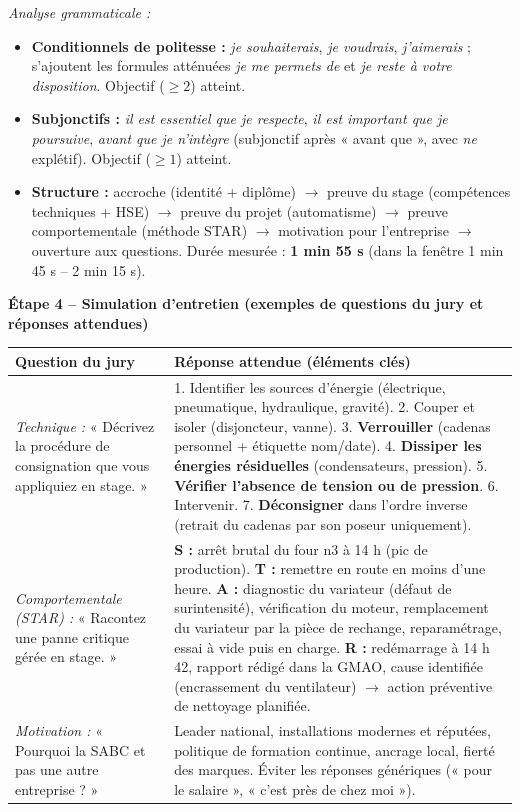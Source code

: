 \documentclass[11pt]{article}
\begin{document}
\emph{Analyse grammaticale :}
\begin{itemize}
    \item \textbf{Conditionnels de politesse :} \emph{je souhaiterais}, \emph{je voudrais}, \emph{j'aimerais} ; s'ajoutent les formules atténuées \emph{je me permets de} et \emph{je reste à votre disposition}. Objectif ($\geq 2$) atteint.
    \item \textbf{Subjonctifs :} \emph{il est essentiel que je respecte}, \emph{il est important que je poursuive}, \emph{avant que je n'intègre} (subjonctif après « avant que », avec \emph{ne} explétif). Objectif ($\geq 1$) atteint.
    \item \textbf{Structure :} accroche (identité + diplôme) $\rightarrow$ preuve du stage (compétences techniques + HSE) $\rightarrow$ preuve du projet (automatisme) $\rightarrow$ preuve comportementale (méthode STAR) $\rightarrow$ motivation pour l'entreprise $\rightarrow$ ouverture aux questions. Durée mesurée : \textbf{1 min 55 s} (dans la fenêtre 1 min 45 s -- 2 min 15 s).
\end{itemize}

\textbf{Étape 4 -- Simulation d'entretien (exemples de questions du jury et réponses attendues)}

\begin{tabularx}{\linewidth}{|l|X|}
\hline
\textbf{Question du jury} & \textbf{Réponse attendue (éléments clés)} \\
\hline
\textit{Technique :} « Décrivez la procédure de consignation que vous appliquiez en stage. » & 1. Identifier les sources d'énergie (électrique, pneumatique, hydraulique, gravité). 2. Couper et isoler (disjoncteur, vanne). 3. \textbf{Verrouiller} (cadenas personnel + étiquette nom/date). 4. \textbf{Dissiper les énergies résiduelles} (condensateurs, pression). 5. \textbf{Vérifier l'absence de tension ou de pression}. 6. Intervenir. 7. \textbf{Déconsigner} dans l'ordre inverse (retrait du cadenas par son poseur uniquement). \\
\hline
\textit{Comportementale (STAR) :} « Racontez une panne critique gérée en stage. » & \textbf{S :} arrêt brutal du four n\textdegree{}3 à 14 h (pic de production). \textbf{T :} remettre en route en moins d'une heure. \textbf{A :} diagnostic du variateur (défaut de surintensité), vérification du moteur, remplacement du variateur par la pièce de rechange, reparamétrage, essai à vide puis en charge. \textbf{R :} redémarrage à 14 h 42, rapport rédigé dans la GMAO, cause identifiée (encrassement du ventilateur) $\rightarrow$ action préventive de nettoyage planifiée. \\
\hline
\textit{Motivation :} « Pourquoi la SABC et pas une autre entreprise ? » & Leader national, installations modernes et réputées, politique de formation continue, ancrage local, fierté des marques. Éviter les réponses génériques (« pour le salaire », « c'est près de chez moi »). \\
\hline
\end{tabularx}
\end{document}
